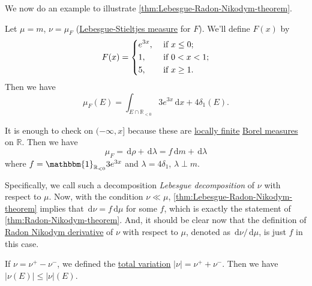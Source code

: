 We now do an example to illustrate \autoref{thm:Lebesgue-Radon-Nikodym-theorem}.
\begin{eg}
	Let \(\mu = m\), \(\nu = \mu_F\) (\hyperref[def:Lebesgue-Stieltjes-measure]{Lebesgue-Stieltjes measure} for \(F\)). We'll define \(F(x)\) by
	\[
		F(x) = \begin{dcases}
			e^{3x}, & \text{ if } x\leq 0 ;   \\
			1,      & \text{ if } 0 < x < 1 ; \\
			5,      & \text{ if } x \geq 1 .
		\end{dcases}
	\]
	Then we have
	\[
		\mu_F(E) = \int_{E \cap \mathbb{R}_{< 0}} 3e^{3x} \,\mathrm{d}x + 4 \delta_1(E).
	\]
\end{eg}
\begin{explanation}
	It is enough to check on \((-\infty,x]\) because these are \hyperref[def:locally-finite]{locally finite} \hyperref[def:Borel-measure]{Borel measures} on \(\mathbb{R}\).
	Then we have
	\[
		\mu_F = \,\mathrm{d}\rho + \,\mathrm{d}\lambda = f\,\mathrm{d}m + \,\mathrm{d}\lambda
	\]
	where \(f = \mathbbm{1}_{\mathbb{R}_{< 0}}3e^{3x}\) and \(\lambda = 4\delta_1\), \(\lambda \perp m\).
\end{explanation}

Specifically, we call such a decomposition \emph{Lebesgue decomposition} of \(\nu \) with respect to \(\mu \). Now, with the condition \(\nu \ll \mu \), \autoref{thm:Lebesgue-Radon-Nikodym-theorem}
implies that \(\,\mathrm{d} \nu = f \,\mathrm{d} \mu \) for some \(f\), which is exactly the statement of \autoref{thm:Radon-Nikodym-theorem}. And, it should
be clear now that the definition of \hyperref[def:Radon-Nikodym-derivative]{Radon Nikodym derivative} of \(\nu \) with respect to \(\mu \), denoted as
\(\,\mathrm{d} \nu / \,\mathrm{d} \mu \), is just \(f\) in this case.

\begin{prev}
	If \(\nu = \nu^+ - \nu^-\), we defined the \hyperref[def:total-variation]{total variation} \(\left\vert \nu \right\vert = \nu^+ + \nu^-\).
	Then we have \(\left\vert \nu(E) \right\vert \leq \left\vert \nu \right\vert(E)\).
\end{prev}

